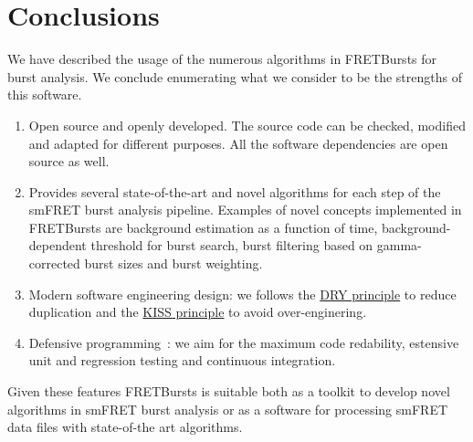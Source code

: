 \section{Conclusions}
\label{sec:conclusions}

We have described the usage of the numerous algorithms in FRETBursts
for burst analysis. We conclude enumerating what we consider to be the strengths
of this software.

\begin{enumerate}
\item Open source and openly developed. The source code can be checked, modified and
adapted for different purposes. All the software dependencies are open source as well.
\item Provides several state-of-the-art and novel algorithms for each step of the 
smFRET burst analysis pipeline. Examples of novel concepts implemented in FRETBursts are background estimation as a function of time,
background-dependent threshold for burst search, burst filtering based on 
gamma-corrected burst sizes and burst weighting.
\item Modern software engineering design: we follows the \href{http://en.wikipedia.org/wiki/Don\%27t_repeat_yourself}{DRY principle} to reduce duplication and the \href{http://en.wikipedia.org/wiki/KISS_principle}{KISS principle} to avoid over-enginering.
\item Defensive programming~\cite{Prli__2012}: we aim for the maximum code redability,
estensive unit and regression testing and continuous integration.
\end{enumerate}

Given these features FRETBursts is suitable both as a toolkit to develop novel algorithms
in smFRET burst analysis or as a software for processing smFRET data files with
state-of-the art algorithms.
